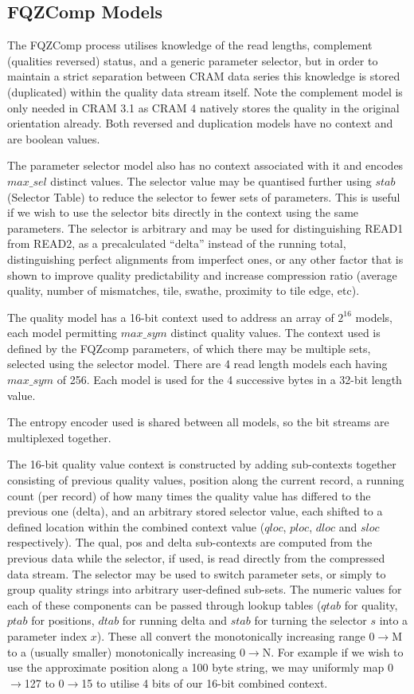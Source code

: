 \documentclass[a4paper]{article}
\begin{document}
\subsection{FQZComp Models}

The FQZComp process utilises knowledge of the read lengths, complement
(qualities reversed) status, and a generic parameter selector, but in
order to maintain a strict separation between CRAM data series this
knowledge is stored (duplicated) within the quality data stream
itself.  Note the complement model is only needed in CRAM 3.1 as CRAM
4 natively stores the quality in the original orientation already.
Both reversed and duplication models have no context and are boolean
values.

The parameter selector model also has no context associated with it
and encodes $max\_sel$ distinct values.  The selector value may be
quantised further using $stab$ (Selector Table) to reduce the selector to fewer
sets of parameters.  This is useful if we wish to use the selector
bits directly in the context using the same parameters.  The selector
is arbitrary and may be used for distinguishing READ1 from READ2, as
a precalculated ``delta'' instead of the running total, distinguishing
perfect alignments from imperfect ones, or any other factor that is
shown to improve quality predictability and increase compression
ratio (average quality, number of mismatches, tile, swathe, proximity
to tile edge, etc).

The quality model has a 16-bit context used to address an array of
$2^{16}$ models, each model permitting $max\_sym$ distinct quality
values.  The context used is defined by the FQZcomp parameters, of
which there may be multiple sets, selected using the selector model.
There are 4 read length models each having $max\_sym$ of 256.  Each
model is used for the 4 successive bytes in a 32-bit length value.

The entropy encoder used is shared between all models, so the bit
streams are multiplexed together.

The 16-bit quality value context is constructed by adding sub-contexts
together consisting of previous quality values, position along the
current record, a running count (per record) of how many times the
quality value has differed to the previous one (delta), and an
arbitrary stored selector value, each shifted to a defined location
within the combined context value ($qloc$, $ploc$, $dloc$ and
$sloc$ respectively).  The qual, pos and delta sub-contexts are
computed from the previous data while the selector, if used, is read
directly from the compressed data stream.  The selector may be used to
switch parameter sets, or simply to group quality strings into
arbitrary user-defined sub-sets.  The numeric values for each of these
components can be passed through lookup tables ($qtab$ for quality,
$ptab$ for positions, $dtab$ for running delta and $stab$ for turning
the selector $s$ into a parameter index $x$).  These all convert the
monotonically increasing range 0$\rightarrow$M to a (usually smaller)
monotonically increasing 0$\rightarrow$N.  For example if we wish to
use the approximate position along a 100 byte string, we may uniformly
map 0$\rightarrow$127 to 0$\rightarrow$15 to utilise 4 bits of our
16-bit combined context.
\end{document}
